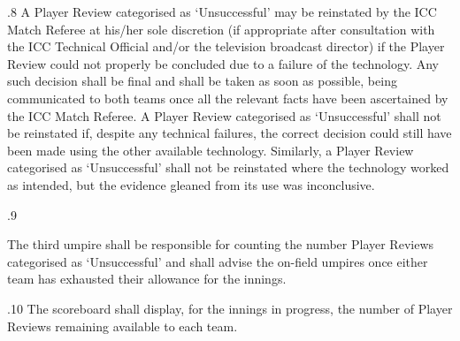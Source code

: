 \documentclass[12pt]{article}
\begin{document}
\vspace{\baselineskip}
\begin{adjustwidth}{0.5in}{0.12in}
{\fontsize{9pt}{10.8pt}.8 \tabto{0.49in} A Player Review categorised as ‘Unsuccessful’ may be reinstated by the ICC Match Referee at his/her sole discretion (if appropriate after consultation with the ICC Technical Official and/or the television broadcast director) if the Player Review could not properly be concluded due to a failure of the technology. Any such decision shall be final and shall be taken as soon as possible, being communicated to both teams once all the relevant facts have been ascertained by the ICC Match Referee. A Player Review categorised as ‘Unsuccessful’ shall not be reinstated if, despite any technical failures, the correct decision could still have been made using the other available technology. Similarly, a Player Review categorised as ‘Unsuccessful’ shall not be reinstated where the technology worked as intended, but the evidence gleaned from its use was inconclusive.\par}\par

\end{adjustwidth}


\vspace{\baselineskip}
\begin{adjustwidth}{0.5in}{0.11in}
{\fontsize{9pt}{10.8pt}.9 \tabto{0.49in} {\fontsize{8pt}{9.6pt}\selectfont The third umpire shall be responsible for counting the number Player Reviews categorised as ‘Unsuccessful’ and shall advise the on-field umpires once either team has exhausted their allowance for the innings.\par}\par}\par

\end{adjustwidth}


\vspace{\baselineskip}
\begin{adjustwidth}{0.5in}{0.14in}
{\fontsize{9pt}{10.8pt}.10 \tabto{0.49in} The scoreboard shall display, for the innings in progress, the number of Player Reviews remaining available to each team.\par}\par

\end{adjustwidth}


\vspace{\baselineskip}
\end{document}
